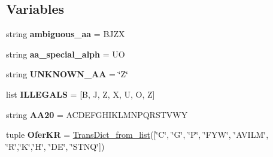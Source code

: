 \subsection*{Variables}
\begin{DoxyCompactItemize}
\item 
\hypertarget{namespacefeat__extract_1_1_a_alphabets_a560e979cdf62dab3e3b6ecf5bc2c117c}{}string {\bfseries ambiguous\+\_\+aa} = \textquotesingle{}B\+J\+Z\+X\textquotesingle{}\label{namespacefeat__extract_1_1_a_alphabets_a560e979cdf62dab3e3b6ecf5bc2c117c}

\item 
\hypertarget{namespacefeat__extract_1_1_a_alphabets_af09bf2e304f5ae670b7b0c19fb5a37f7}{}string {\bfseries aa\+\_\+special\+\_\+alph} = \textquotesingle{}U\+O\textquotesingle{}\label{namespacefeat__extract_1_1_a_alphabets_af09bf2e304f5ae670b7b0c19fb5a37f7}

\item 
\hypertarget{namespacefeat__extract_1_1_a_alphabets_ae242f6213ce8397e07ba87a37a86b779}{}string {\bfseries U\+N\+K\+N\+O\+W\+N\+\_\+\+A\+A} = \char`\"{}Z\char`\"{}\label{namespacefeat__extract_1_1_a_alphabets_ae242f6213ce8397e07ba87a37a86b779}

\item 
\hypertarget{namespacefeat__extract_1_1_a_alphabets_ae08fef30a44f50cf59eff29cfb657d07}{}list {\bfseries I\+L\+L\+E\+G\+A\+L\+S} = \mbox{[}\textquotesingle{}B\textquotesingle{}, \textquotesingle{}J\textquotesingle{}, \textquotesingle{}Z\textquotesingle{}, \textquotesingle{}X\textquotesingle{}, \textquotesingle{}U\textquotesingle{}, \textquotesingle{}O\textquotesingle{}, \textquotesingle{}Z\textquotesingle{}\mbox{]}\label{namespacefeat__extract_1_1_a_alphabets_ae08fef30a44f50cf59eff29cfb657d07}

\item 
\hypertarget{namespacefeat__extract_1_1_a_alphabets_ae72f3d1270cfc57ed971653854371ca0}{}string {\bfseries A\+A20} = \textquotesingle{}A\+C\+D\+E\+F\+G\+H\+I\+K\+L\+M\+N\+P\+Q\+R\+S\+T\+V\+W\+Y\textquotesingle{}\label{namespacefeat__extract_1_1_a_alphabets_ae72f3d1270cfc57ed971653854371ca0}

\item 
\hypertarget{namespacefeat__extract_1_1_a_alphabets_a71389e54ae43a6f0d9f44490c2153f7e}{}tuple {\bfseries Ofer\+K\+R} = \hyperlink{namespacefeat__extract_1_1_a_alphabets_acdda8523b57175e0e79064c4da723c5d}{Trans\+Dict\+\_\+from\+\_\+list}(\mbox{[}\char`\"{}C\char`\"{}, \char`\"{}G\char`\"{}, \char`\"{}P\char`\"{}, \char`\"{}F\+Y\+W\char`\"{}, \char`\"{}A\+V\+I\+L\+M\char`\"{}, \char`\"{}R\char`\"{},\char`\"{}K\char`\"{},\char`\"{}H\char`\"{}, \char`\"{}D\+E\char`\"{}, \char`\"{}S\+T\+N\+Q\char`\"{}\mbox{]})\label{namespacefeat__extract_1_1_a_alphabets_a71389e54ae43a6f0d9f44490c2153f7e}


\end{DoxyCompactItemize}
